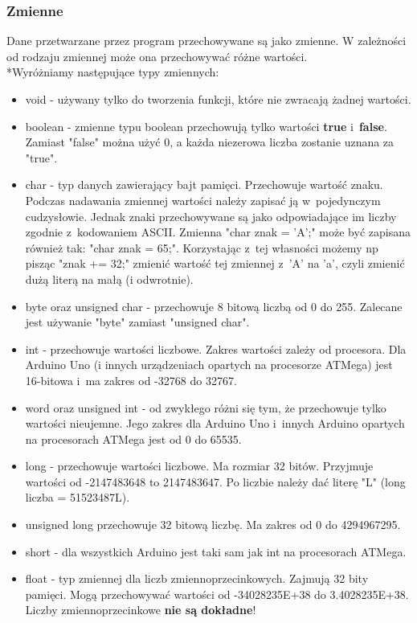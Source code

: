 \documentclass[a4paper,12pt, twoside]{article}
\begin{document}
	\subsubsection{Zmienne}
		Dane przetwarzane przez program przechowywane są jako zmienne. W zależności od rodzaju zmiennej może ona przechowywać różne wartości.
		\\*Wyróżniamy następujące typy zmiennych:
		\begin{itemize}
			\item void - używany tylko do tworzenia funkcji, które nie zwracają żadnej wartości.
			\item boolean - zmienne typu boolean przechowują tylko wartości \textbf{true} i~\textbf{false}. Zamiast "false" można użyć $0$, a każda niezerowa liczba zostanie uznana za "true".
			\item char - typ danych zawierający bajt pamięci. Przechowuje wartość znaku.
				Podczas nadawania zmiennej wartości należy zapisać ją w~pojedynczym cudzysłowie.
				Jednak znaki przechowywane są jako odpowiadające im liczby zgodnie z~kodowaniem ASCII.
				Zmienna "char znak = 'A';" może być zapisana również tak: "char znak = 65;".
				Korzystając z~tej własności możemy np pisząc "znak += 32;" zmienić wartość tej zmiennej z~'A' na 'a', czyli zmienić dużą literą na małą (i odwrotnie).
			\item byte oraz unsigned char - przechowuje 8 bitową liczbą od 0 do 255. Zalecane jest używanie "byte" zamiast "unsigned char".
			\item int - przechowuje wartości liczbowe. Zakres wartości zależy od procesora.
				Dla Arduino Uno (i innych urządzeniach opartych na procesorze ATMega) jest 16-bitowa i~ma zakres od -32768 do 32767.
			\item word oraz unsigned int - od zwykłego różni się tym, że przechowuje tylko wartości nieujemne.
				Jego zakres dla Arduino Uno i~innych Arduino opartych na procesorach ATMega jest od 0 do 65535.
			\item long - przechowuje wartości liczbowe. Ma rozmiar 32 bitów. Przyjmuje wartości od -2147483648 to 2147483647. Po liczbie należy dać literę "L" (long liczba = 51523487L).
			\item unsigned long przechowuje 32 bitową liczbę. Ma zakres od 0 do 4294967295.
			\item short - dla wszystkich Arduino jest taki sam jak int na procesorach ATMega.
			\item float - typ zmiennej dla liczb zmiennoprzecinkowych. Zajmują 32 bity pamięci. Mogą przechowywać wartości od -34028235E+38 do 3.4028235E+38. Liczby zmiennoprzecinkowe \textbf{nie są dokładne}!

\end{itemize}
\end{document}
